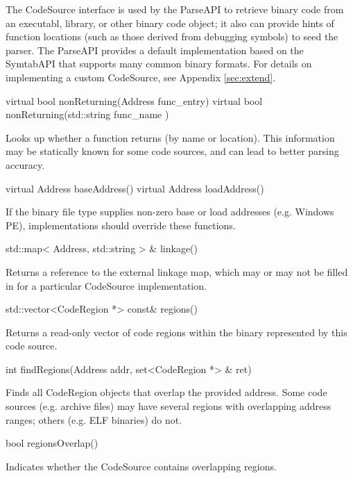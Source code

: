 \documentclass{article}
\newenvironment{apient}{\small\verbatim}{\endverbatim}
\newcommand{\apidesc}[1]{%
{\addtolength{\leftskip}{4em}%
#1\par\medskip}
}
\begin{document}
The CodeSource interface is used by the ParseAPI to retrieve binary code from an executabl, library, or other binary code object; it also can provide hints of function locations (such as those derived from debugging symbols) to seed the parser. The ParseAPI provides a default implementation based on the SymtabAPI that supports many common binary formats. For details on implementing a custom CodeSource, see Appendix \ref{sec:extend}.

\begin{apient}
virtual bool nonReturning(Address func_entry)
\end{apient}
\begin{apient}
virtual bool nonReturning(std::string func_name )
\end{apient}
\apidesc{Looks up whether a function returns (by name or location). This information may be statically known for some code sources, and can lead to better parsing accuracy.}

\begin{apient}
virtual Address baseAddress()
virtual Address loadAddress()
\end{apient}
\apidesc{If the binary file type supplies non-zero base or load addresses (e.g. Windows PE), implementations should override these functions.}

\begin{apient}
std::map< Address, std::string > & linkage()
\end{apient}
\apidesc{Returns a reference to the external linkage map, which may or may not be filled in for a particular CodeSource implementation.}

\begin{apient}
std::vector<CodeRegion *> const& regions()
\end{apient}
\apidesc{Returns a read-only vector of code regions within the binary represented by this code source.}

\begin{apient}
int findRegions(Address addr, set<CodeRegion *> & ret)
\end{apient}
\apidesc{Finds all CodeRegion objects that overlap the provided address. Some code sources (e.g. archive files) may have several regions with overlapping address ranges; others (e.g. ELF binaries) do not.}

\begin{apient}
bool regionsOverlap() 
\end{apient}
\apidesc{Indicates whether the CodeSource contains overlapping regions.}
\end{document}

